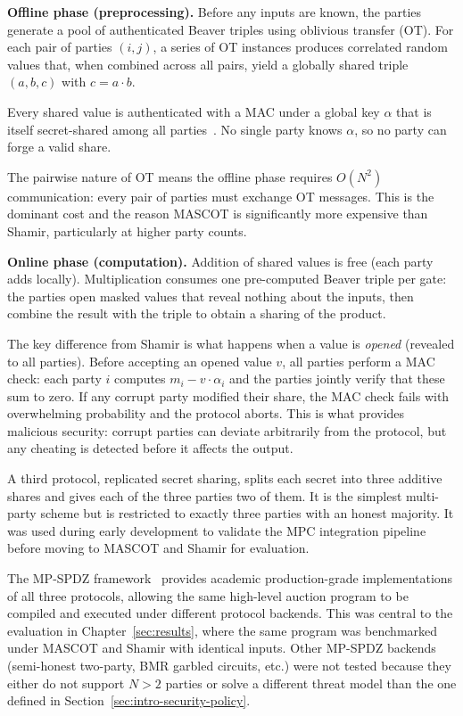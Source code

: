 \textbf{Offline phase (preprocessing).}  Before any inputs are known, the
parties generate a pool of authenticated Beaver triples using oblivious
transfer (OT).  For each pair of parties $(i, j)$, a series of OT instances
produces correlated random values that, when combined across all pairs, yield
a globally shared triple $(a, b, c)$ with $c = a \cdot b$.

Every shared value is authenticated with a MAC under a global key $\alpha$
that is itself secret-shared among all parties~\cite{damgaard2011_spdz}.
No single party knows $\alpha$, so no party can forge a valid share.

The pairwise nature of OT means the offline phase requires $O(N^2)$
communication: every pair of parties must exchange OT messages.  This is the
dominant cost and the reason MASCOT is significantly more expensive than
Shamir, particularly at higher party counts.

\textbf{Online phase (computation).}  Addition of shared values is free
(each party adds locally).  Multiplication consumes one pre-computed Beaver
triple per gate: the parties open masked values that reveal nothing about the
inputs, then combine the result with the triple to obtain a sharing of the
product.

The key difference from Shamir is what happens when a value is \emph{opened}
(revealed to all parties).  Before accepting an opened value $v$, all parties
perform a MAC check: each party $i$ computes $m_i - v \cdot \alpha_i$ and
the parties jointly verify that these sum to zero.  If any corrupt party
modified their share, the MAC check fails with overwhelming probability and
the protocol aborts.  This is what provides malicious security: corrupt
parties can deviate arbitrarily from the protocol, but any cheating is
detected before it affects the output.

A third protocol, replicated secret sharing, splits each secret into three
additive shares and gives each of the three parties two of them.  It is the
simplest multi-party scheme but is restricted to exactly three parties with an
honest majority.  It was used during early development to validate the MPC
integration pipeline before moving to MASCOT and Shamir for evaluation.

The MP-SPDZ framework~\cite{mp-spdz} provides academic production-grade
implementations of all three protocols, allowing the same high-level auction
program to be compiled and executed under different protocol backends.  This
was central to the evaluation in Chapter~\ref{sec:results}, where the same
program was benchmarked under MASCOT and Shamir with identical inputs.  Other
MP-SPDZ backends (semi-honest two-party, BMR garbled circuits, etc.) were not
tested because they either do not support $N > 2$ parties or solve a different
threat model than the one defined in Section~\ref{sec:intro-security-policy}.

